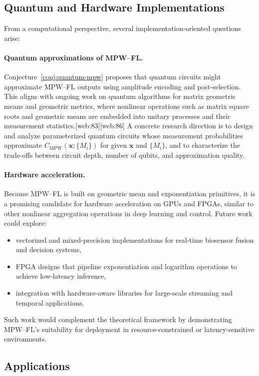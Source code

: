 \documentclass[11pt]{article}
\begin{document}
\subsection{Quantum and Hardware Implementations}
\label{subsec:quantum-hardware}

From a computational perspective, several implementation-oriented questions arise:

\paragraph{Quantum approximations of MPW--FL.}
Conjecture~\ref{conj:quantum-mpw} proposes that quantum circuits might approximate MPW--FL outputs using amplitude encoding and post-selection. This aligns with ongoing work on quantum algorithms for matrix geometric means and geometric metrics, where nonlinear operations such as matrix square roots and geometric means are embedded into unitary processes and their measurement statistics.[web:83][web:86] A concrete research direction is to design and analyze parameterized quantum circuits whose measurement probabilities approximate $C_{\mathrm{MPW}}(\mathbf{x};\{M_i\})$ for given $\mathbf{x}$ and $\{M_i\}$, and to characterize the trade-offs between circuit depth, number of qubits, and approximation quality.

\paragraph{Hardware acceleration.}
Because MPW--FL is built on geometric mean and exponentiation primitives, it is a promising candidate for hardware acceleration on GPUs and FPGAs, similar to other nonlinear aggregation operations in deep learning and control. Future work could explore:
\begin{itemize}
  \item vectorized and mixed-precision implementations for real-time biosensor fusion and decision systems,
  \item FPGA designs that pipeline exponentiation and logarithm operations to achieve low-latency inference,
  \item integration with hardware-aware libraries for large-scale streaming and temporal applications.
\end{itemize}
Such work would complement the theoretical framework by demonstrating MPW--FL’s suitability for deployment in resource-constrained or latency-sensitive environments.

\subsection{Applications}
\label{subsec:applications}
\end{document}

